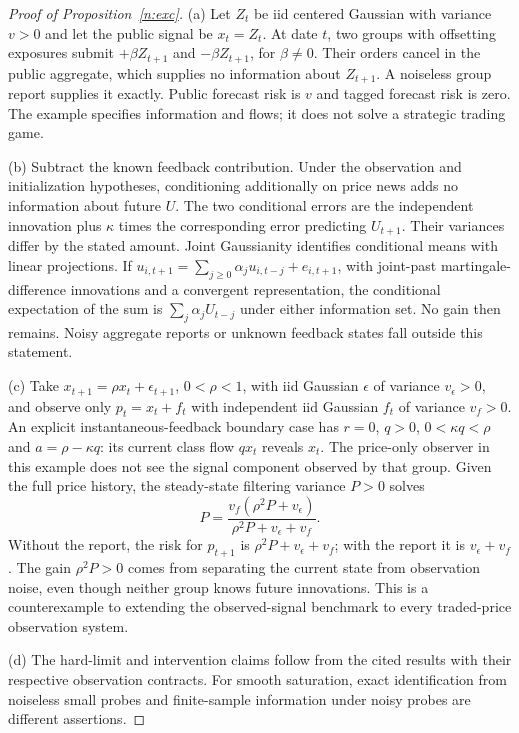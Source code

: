 \begin{proof}[Proof of Proposition~\ref{n:exc}]
(a) Let $Z_t$ be iid centered Gaussian with variance $v>0$ and let the public signal be $x_t=Z_t$. At date $t$, two groups with offsetting exposures submit $+\beta Z_{t+1}$ and $-\beta Z_{t+1}$, for $\beta\ne0$. Their orders cancel in the public aggregate, which supplies no information about $Z_{t+1}$. A noiseless group report supplies it exactly. Public forecast risk is $v$ and tagged forecast risk is zero. The example specifies information and flows; it does not solve a strategic trading game.

(b) Subtract the known feedback contribution. Under the observation and initialization hypotheses, conditioning additionally on price news adds no information about future $U$. The two conditional errors are the independent innovation plus $\kappa$ times the corresponding error predicting $U_{t+1}$. Their variances differ by the stated amount. Joint Gaussianity identifies conditional means with linear projections. If $u_{i,t+1}=\sum_{j\ge0}\alpha_j u_{i,t-j}+e_{i,t+1}$, with joint-past martingale-difference innovations and a convergent representation, the conditional expectation of the sum is $\sum_j\alpha_j U_{t-j}$ under either information set. No gain then remains. Noisy aggregate reports or unknown feedback states fall outside this statement.

(c) Take $x_{t+1}=\rho x_t+\epsilon_{t+1}$, $0<\rho<1$, with iid Gaussian $\epsilon$ of variance $v_\epsilon>0$, and observe only $p_t=x_t+f_t$ with independent iid Gaussian $f_t$ of variance $v_f>0$. An explicit instantaneous-feedback boundary case has $r=0$, $q>0$, $0<\kappa q<\rho$ and $a=\rho-\kappa q$: its current class flow $qx_t$ reveals $x_t$. The price-only observer in this example does not see the signal component observed by that group. Given the full price history, the steady-state filtering variance $P>0$ solves
\[
P=\frac{v_f(\rho^2P+v_\epsilon)}{\rho^2P+v_\epsilon+v_f}.
\]
Without the report, the risk for $p_{t+1}$ is $\rho^2P+v_\epsilon+v_f$; with the report it is $v_\epsilon+v_f$. The gain $\rho^2P>0$ comes from separating the current state from observation noise, even though neither group knows future innovations. This is a counterexample to extending the observed-signal benchmark to every traded-price observation system.

(d) The hard-limit and intervention claims follow from the cited results with their respective observation contracts. For smooth saturation, exact identification from noiseless small probes and finite-sample information under noisy probes are different assertions.
\end{proof}

